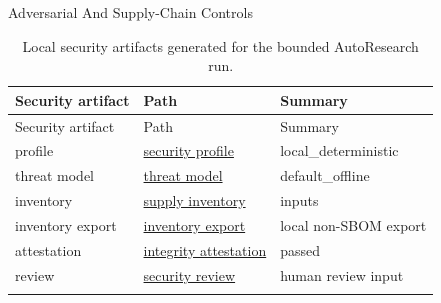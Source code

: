 \documentclass[
  ignorenonframetext,
]{beamer}
\begin{document}
\begin{frame}{Adversarial And Supply-Chain
Controls}
\begin{longtable}[]{@{}
  >{\raggedright\arraybackslash}p{}
  >{\raggedright\arraybackslash}p{}
  >{\raggedright\arraybackslash}p{}@{}}
\caption{Local security artifacts generated for the bounded AutoResearch
run.}\label{tbl:security-artifacts}\tabularnewline
\toprule\noalign{}
\begin{minipage}[b]{\linewidth}\raggedright
Security artifact
\end{minipage} & \begin{minipage}[b]{\linewidth}\raggedright
Path
\end{minipage} & \begin{minipage}[b]{\linewidth}\raggedright
Summary
\end{minipage} \\
\midrule\noalign{}
\endfirsthead
\toprule\noalign{}
\begin{minipage}[b]{\linewidth}\raggedright
Security artifact
\end{minipage} & \begin{minipage}[b]{\linewidth}\raggedright
Path
\end{minipage} & \begin{minipage}[b]{\linewidth}\raggedright
Summary
\end{minipage} \\
\midrule\noalign{}
\endhead
profile & \href{../data/autoresearch_security_profile.json}{security
profile} & local\_deterministic \\
threat model & \href{../data/autoresearch_threat_model.json}{threat
model} & default\_offline \\
inventory &
\href{../data/autoresearch_supply_chain_inventory.json}{supply
inventory} & 14 inputs \\
inventory export &
\href{../data/autoresearch_inventory_export.json}{inventory export} &
local non-SBOM export \\
attestation &
\href{../data/autoresearch_integrity_attestation.json}{integrity
attestation} & passed \\
review & \href{../reports/autoresearch_security_review.md}{security
review} & human review input \\
\bottomrule\noalign{}
\end{longtable}

\begingroup\footnotesize


\end{frame}
\end{document}
